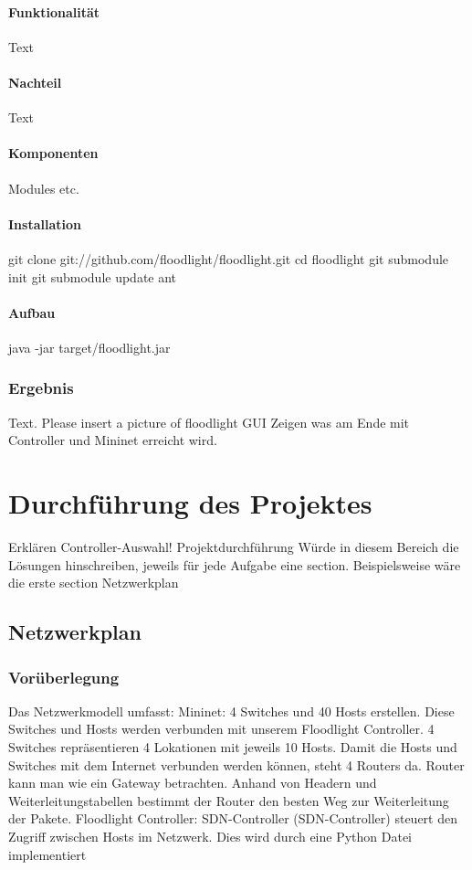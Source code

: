 \documentclass[fontsize=12pt,paper=a4,open=any,parskip=half,
  twoside=false,toc=listof,toc=bibliography,fleqn,leqno,
  captions=nooneline,captions=tableabove,british]{scrbook}
\begin{document}
\subsubsection{Funktionalität}
Text
\subsubsection{Nachteil}
Text
\subsubsection{Komponenten}
Modules etc.
\subsubsection{Installation}
git clone git://github.com/floodlight/floodlight.git
cd floodlight
git submodule init
git submodule update
ant
\subsubsection{Aufbau}
java -jar target/floodlight.jar

\subsection{Ergebnis}
Text. Please insert a picture of floodlight GUI
Zeigen was am Ende mit Controller und Mininet erreicht wird.



\chapter{Durchführung des Projektes}
Erklären Controller-Auswahl!
Projektdurchführung
Würde in diesem Bereich die Lösungen hinschreiben, jeweils für jede Aufgabe eine section. Beispielsweise wäre die erste section Netzwerkplan



\section{Netzwerkplan}
\subsection{Vorüberlegung}
Das Netzwerkmodell umfasst:
Mininet: 4 Switches und 40 Hosts erstellen. Diese Switches und Hosts werden verbunden mit unserem Floodlight Controller. 4 Switches repräsentieren 4 Lokationen mit jeweils 10 Hosts. Damit die Hosts und Switches mit dem Internet verbunden werden können, steht 4 Routers da. Router kann man wie ein Gateway betrachten. Anhand von Headern und Weiterleitungstabellen bestimmt der Router den besten Weg zur Weiterleitung der Pakete.
Floodlight Controller: SDN-Controller (SDN-Controller) steuert den Zugriff zwischen Hosts im Netzwerk. Dies wird durch eine Python Datei implementiert
\end{document}
